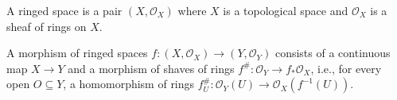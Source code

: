 A ringed space is a pair $(X, \mathcal{O}_X)$ where $X$ is a topological space
and $\mathcal{O}_X$ is a sheaf of rings on $X$.

A morphism of ringed spaces $f\colon (X, \mathcal{O}_X) \to (Y, \mathcal{O}_Y)$
consists of a continuous map $X\to Y$ and a morphism of shaves of rings
$f^\#\colon \mathcal{O}_Y\to f_*\mathcal{O}_X$, i.e., for every open $O \subseteq Y$,
a homomorphism of rings $f^\#_U\colon \mathcal{O}_Y(U)\to \mathcal{O}_X(f^{-1}(U))$.
